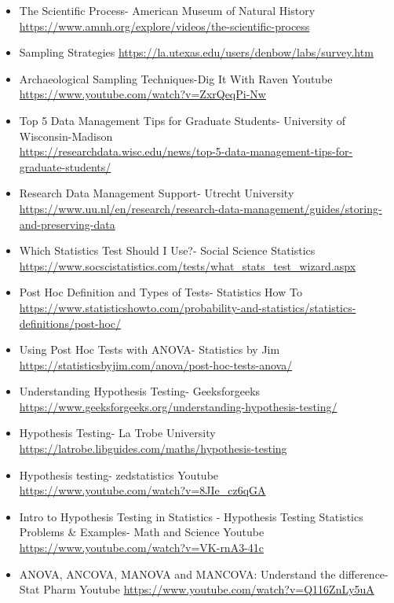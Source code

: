 \documentclass{article}
\begin{document}
\begin{itemize}
    \item The Scientific Process- American Museum of Natural History\\
    \url{https://www.amnh.org/explore/videos/the-scientific-process}
    \item Sampling Strategies \url{https://la.utexas.edu/users/denbow/labs/survey.htm}
    \item Archaeological Sampling Techniques-Dig It With Raven Youtube\\
    \url{https://www.youtube.com/watch?v=ZxrQeqPi-Nw}
    \item Top 5 Data Management Tips for Graduate Students- University of Wisconsin-Madison\\ \url{https://researchdata.wisc.edu/news/top-5-data-management-tips-for-graduate-students/}
    \item Research Data Management Support- Utrecht University\\
    \url{https://www.uu.nl/en/research/research-data-management/guides/storing-and-preserving-data}
   \item Which Statistics Test Should I Use?- Social Science Statistics \\
   \url{https://www.socscistatistics.com/tests/what_stats_test_wizard.aspx}
    \item Post Hoc Definition and Types of Tests- Statistics How To \url{https://www.statisticshowto.com/probability-and-statistics/statistics-definitions/post-hoc/}
    \item Using Post Hoc Tests with ANOVA- Statistics by Jim\\
    \url{https://statisticsbyjim.com/anova/post-hoc-tests-anova/}
    \item Understanding Hypothesis Testing- Geeksforgeeks \\
    \url{https://www.geeksforgeeks.org/understanding-hypothesis-testing/}
    \item Hypothesis Testing- La Trobe University \\
    \url{https://latrobe.libguides.com/maths/hypothesis-testing}
    \item Hypothesis testing- zedstatistics Youtube\\ \url{https://www.youtube.com/watch?v=8JIe_cz6qGA}
    \item Intro to Hypothesis Testing in Statistics - Hypothesis Testing Statistics Problems \& Examples- Math and Science Youtube 
    \url{https://www.youtube.com/watch?v=VK-rnA3-41c}
    \item ANOVA, ANCOVA, MANOVA and MANCOVA: Understand the difference- Stat Pharm Youtube \url{https://www.youtube.com/watch?v=Q116ZnLy5uA}

\end{itemize}
\end{document}
